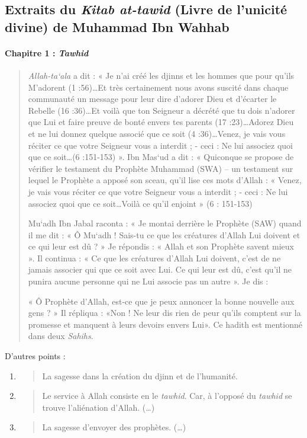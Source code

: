 \subsection{Extraits du \emph{Kitab at-tawid} (Livre de
l'unicité divine) de Muhammad Ibn Wahhab}
\paragraph{{Chapitre 1} : \emph{Tawhid}}

\begin{quote}
\emph{Allah-ta`ala} a dit : « Je n'ai créé les djinns et les hommes que
pour qu'ils M'adorent (1 :56)\ldots Et très certainement nous avons
suscité dans chaque communauté un message pour leur dire d'adorer Dieu
et d'écarter le Rebelle (16 :36)\ldots Et voilà que ton Seigneur a
décrété que tu dois n'adorer que Lui et faire preuve de bonté envers tes
parents (17 :23)\ldots Adorez Dieu et ne lui donnez quelque associé que
ce soit (4 :36)\ldots Venez, je vais vous réciter ce que votre Seigneur
vous a interdit ; - ceci : Ne lui associez quoi que ce soit\ldots(6
:151-153) ». Ibn Mas`ud a dit : « Quiconque se propose de vérifier le
testament du Prophète Muhammad (SWA) -- un testament sur lequel le
Prophète a apposé son sceau, qu'il lise ces mots d'Allah : « Venez, je
vais vous réciter ce que votre Seigneur vous a interdit ; - ceci : Ne
lui associez quoi que ce soit\ldots Voilà ce qu'il enjoint » (6 :
151-153)

Mu`adh Ibn Jabal raconta : « Je montai derrière le Prophète (SAW) quand
il me dit : « Ô Mu`adh ! Sais-tu ce que les créatures d'Allah Lui
doivent et ce qui leur est dû ? » Je répondis : « Allah et son Prophète
savent mieux ». Il continua : « Ce que les créatures d'Allah Lui
doivent, c'est de ne jamais associer qui que ce soit avec Lui. Ce qui
leur est dû, c'est qu'il ne punira aucune personne qui ne Lui associe
pas un autre ». Je dis :

« Ô Prophète d'Allah, est-ce que je peux annoncer la bonne nouvelle aux
gens ? » Il répliqua : «Non ! Ne leur dis rien de peur qu'ils comptent
sur la promesse et manquent à leurs devoirs envers Lui». Ce hadith est
mentionné dans deux \emph{Sahihs}.
\end{quote}
D'autres points :


\begin{enumerate}

\item
  \begin{quote}
  La sagesse dans la création du djinn et de l'humanité.
  \end{quote}
\item
  \begin{quote}
  Le service à Allah consiste en le \emph{tawhid}. Car, à l'opposé du
  \emph{tawhid} se trouve l'aliénation d'Allah. (\ldots)
  \end{quote}
\item
  \begin{quote}
  La sagesse d'envoyer des prophètes. (\ldots)
  \end{quote}
\end{enumerate}
